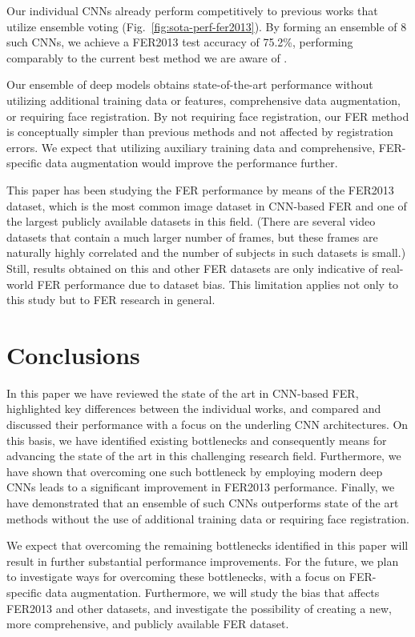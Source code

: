 \documentclass[conference,10pt,a4paper]{IEEEtran}
\begin{document}
Our individual CNNs already perform competitively to previous works that utilize ensemble voting (Fig.~\ref{fig:sota-perf-fer2013}). By forming an ensemble of 8 such CNNs, we achieve a FER2013 test accuracy of 75.2\%, performing comparably to the current best method we are aware of \cite{zhang2015}.

Our ensemble of deep models obtains state-of-the-art performance without utilizing additional training data or features, comprehensive data augmentation, or requiring face registration. By not requiring face registration, our FER method is conceptually simpler than previous methods and not affected by registration errors. We expect that utilizing auxiliary training data and comprehensive, FER-specific data augmentation would improve the performance further.

This paper has been studying the FER performance by means of the FER2013 dataset, which is the most common image dataset in CNN-based FER and one of the largest publicly available datasets in this field. (There are several video datasets that contain a much larger number of frames, but these frames are naturally highly correlated and the number of subjects in such datasets is small.) Still, results obtained on this and other FER datasets are only indicative of real-world FER performance due to dataset bias. This limitation applies not only to this study but to FER research in general.

\section{Conclusions}



In this paper we have reviewed the state of the art in CNN-based FER, highlighted key differences between the individual works, and compared and discussed their performance with a focus on the underling CNN architectures. On this basis, we have identified existing bottlenecks and consequently means for advancing the state of the art in this challenging research field. Furthermore, we have shown that overcoming one such bottleneck by employing modern deep CNNs leads to a significant improvement in FER2013 performance. Finally, we have demonstrated that an ensemble of such CNNs outperforms state of the art methods without the use of additional training data or requiring face registration.



We expect that overcoming the remaining bottlenecks identified in this paper will result in further substantial performance improvements. For the future, we plan to investigate ways for overcoming these bottlenecks, with a focus on FER-specific data augmentation. Furthermore, we will study the bias that affects FER2013 and other datasets, and investigate the possibility of creating a new, more comprehensive, and publicly available FER dataset.





\end{document}
